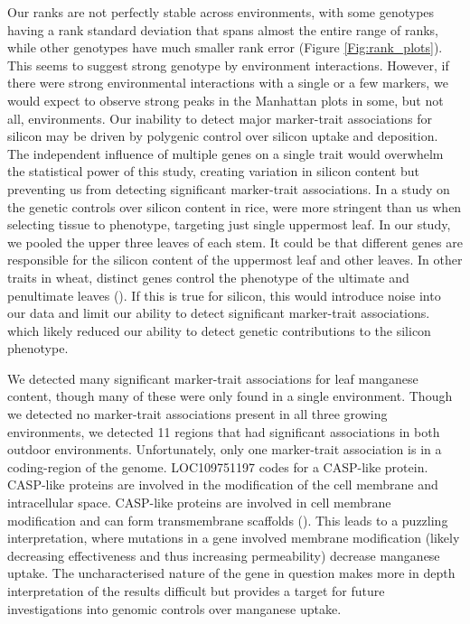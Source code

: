 \documentclass[12pt, letterpaper]{report}
\begin{document}
Our ranks are not perfectly stable across environments, with some genotypes having a rank standard deviation that spans almost the entire range of ranks, while other genotypes have much smaller rank error (Figure \ref{Fig:rank_plots}). This seems to suggest strong genotype by environment interactions. However, if there were strong environmental interactions with a single or a few markers, we would expect to observe strong peaks in the Manhattan plots in some, but not all, environments. Our inability to detect major marker-trait associations for silicon may be driven by polygenic control over silicon uptake and deposition. The independent influence of multiple genes on a single trait would overwhelm the statistical power of this study, creating variation in silicon content but preventing us from detecting significant marker-trait associations. In a study on the genetic controls over silicon content in rice, \textcite{dai_genetic_2005} were more stringent than us when selecting tissue to phenotype, targeting just single uppermost leaf. In our study, we pooled the upper three leaves of each stem. It could be that different genes are responsible for the silicon content of the uppermost leaf and other leaves. In other traits in wheat, distinct genes control the phenotype of the ultimate and penultimate leaves (\cite{isidro2012quantitative}). If this is true for silicon, this would introduce noise into our data and limit our ability to detect significant marker-trait associations. which likely reduced our ability to detect genetic contributions to the silicon phenotype.

We detected many significant marker-trait associations for leaf manganese content, though many of these were only found in a single environment. Though we detected no marker-trait associations present in all three growing environments, we detected 11 regions that had significant associations in both outdoor environments. Unfortunately, only one marker-trait association is in a coding-region of the genome. LOC109751197 codes for a CASP-like protein. CASP-like proteins are involved in the modification of the cell membrane and intracellular space. CASP-like proteins are involved in cell membrane modification and can form transmembrane scaffolds (\cite{roppolo_functional_2014}). This leads to a puzzling interpretation, where mutations in a gene involved membrane modification (likely decreasing effectiveness and thus increasing permeability) decrease manganese uptake. The uncharacterised nature of the gene in question makes more in depth interpretation of the results difficult but provides a target for future investigations into genomic controls over manganese uptake. 
\end{document}
